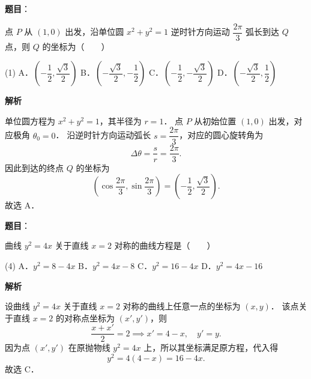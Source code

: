 \begin{answer}

\textbf{题目}：

点 $P$ 从 $(1, 0)$ 出发，沿单位圆 $x^2 + y^2 = 1$ 逆时针方向运动 $\dfrac{2\pi}{3}$ 弧长到达 $Q$ 点，则 $Q$ 的坐标为\mbox{（　　）}

\begin{gkopts}(1)
\task A．$\left(-\dfrac{1}{2}, \dfrac{\sqrt{3}}{2}\right)$
\task B．$\left(-\dfrac{\sqrt{3}}{2}, -\dfrac{1}{2}\right)$
\task C．$\left(-\dfrac{1}{2}, -\dfrac{\sqrt{3}}{2}\right)$
\task D．$\left(-\dfrac{\sqrt{3}}{2}, \dfrac{1}{2}\right)$
\end{gkopts}

\textbf{解析}

单位圆方程为 $x^2 + y^2 = 1$，其半径为 $r = 1$．
点 $P$ 从初始位置 $(1, 0)$ 出发，对应极角 $\theta_0 = 0$．
沿逆时针方向运动弧长 $s = \dfrac{2\pi}{3}$，对应的圆心旋转角为
\nopagebreak[4]
\[
\Delta\theta = \frac{s}{r} = \frac{2\pi}{3}.
\]
因此到达的终点 $Q$ 的坐标为
\nopagebreak[4]
\[
\left(\cos\frac{2\pi}{3}, \sin\frac{2\pi}{3}\right) = \left(-\frac{1}{2}, \frac{\sqrt{3}}{2}\right).
\]
故选 A．


\end{answer}
\begin{answer}

\textbf{题目}：

曲线 $y^2 = 4x$ 关于直线 $x = 2$ 对称的曲线方程是\mbox{（　　）}

\begin{gkopts}(4)
\task A．$y^2 = 8 - 4x$
\task B．$y^2 = 4x - 8$
\task C．$y^2 = 16 - 4x$
\task D．$y^2 = 4x - 16$
\end{gkopts}

\textbf{解析}

设曲线 $y^2 = 4x$ 关于直线 $x = 2$ 对称的曲线上任意一点的坐标为 $(x, y)$．
该点关于直线 $x = 2$ 的对称点坐标为 $(x', y')$，则
\nopagebreak[4]
\[
\frac{x + x'}{2} = 2 \implies x' = 4 - x, \quad y' = y.
\]
因为点 $(x', y')$ 在原抛物线 $y^2 = 4x$ 上，所以其坐标满足原方程，代入得
\nopagebreak[4]
\[
y^2 = 4(4 - x) = 16 - 4x.
\]
故选 C．


\end{answer}

